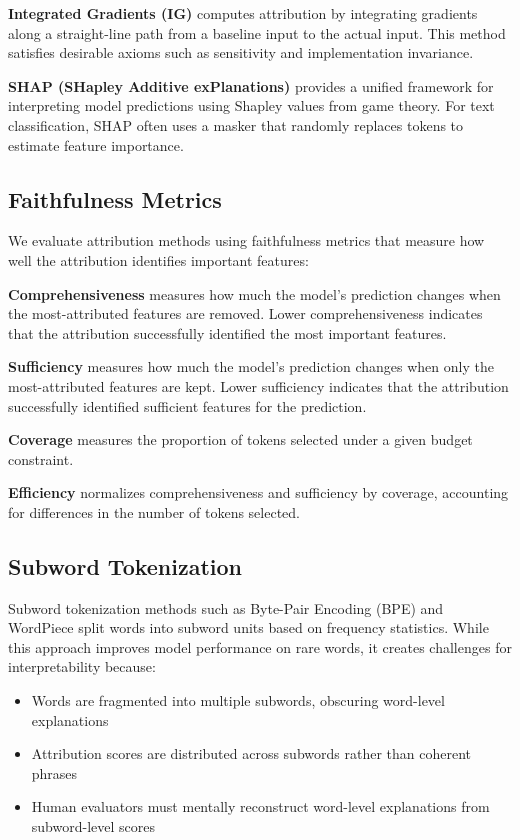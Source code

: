\documentclass[journal]{IEEEtran}
\begin{document}
\textbf{Integrated Gradients (IG)} \cite{IG} computes attribution by integrating gradients along a straight-line path from a baseline input to the actual input. This method satisfies desirable axioms such as sensitivity and implementation invariance.

\textbf{SHAP (SHapley Additive exPlanations)} \cite{SHAP} provides a unified framework for interpreting model predictions using Shapley values from game theory. For text classification, SHAP often uses a masker that randomly replaces tokens to estimate feature importance.

\subsection{Faithfulness Metrics}

We evaluate attribution methods using faithfulness metrics that measure how well the attribution identifies important features:

\textbf{Comprehensiveness} measures how much the model's prediction changes when the most-attributed features are removed. Lower comprehensiveness indicates that the attribution successfully identified the most important features.

\textbf{Sufficiency} measures how much the model's prediction changes when only the most-attributed features are kept. Lower sufficiency indicates that the attribution successfully identified sufficient features for the prediction.

\textbf{Coverage} measures the proportion of tokens selected under a given budget constraint.

\textbf{Efficiency} normalizes comprehensiveness and sufficiency by coverage, accounting for differences in the number of tokens selected.

\subsection{Subword Tokenization}

Subword tokenization methods such as Byte-Pair Encoding (BPE) \cite{BPE} and WordPiece \cite{WordPiece} split words into subword units based on frequency statistics. While this approach improves model performance on rare words, it creates challenges for interpretability because:
\begin{itemize}
    \item Words are fragmented into multiple subwords, obscuring word-level explanations
    \item Attribution scores are distributed across subwords rather than coherent phrases
    \item Human evaluators must mentally reconstruct word-level explanations from subword-level scores
\end{itemize}
\end{document}
